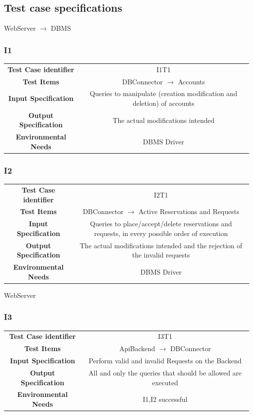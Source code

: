 \documentclass{article}
\begin{document}
\subsection{Test case specifications}
WebServer $\rightarrow$ DBMS
\subsubsection{I1}
\begin{adjustbox}{width=1.2\textwidth}	
	\begin{tabular}{*{2}{c}}
		\toprule
		\textbf{Test Case identifier} & I1T1\\
		\textbf{Test Items} & DBConnector $\rightarrow$ Accounts \\
		\textbf{Input Specification} & Queries to manipulate (creation modification and deletion) of accounts\\
		\textbf{Output Specification} & The actual modifications intended\\
		\textbf{Environmental Needs} & DBMS Driver\\
		\bottomrule
	\end{tabular}
\end{adjustbox}
\subsubsection{I2}
\begin{adjustbox}{width=1.2\textwidth}	
	\begin{tabular}{*{2}{c}}
		\toprule
		\textbf{Test Case identifier} & I2T1\\
		\textbf{Test Items} & DBConnector $\rightarrow$ Active Reservations and Requests \\
		\textbf{Input Specification} & Queries to place/accept/delete reservations and requests, in every possible order of execution\\
		\textbf{Output Specification} & The actual modifications intended and the rejection of the invalid requests\\
		\textbf{Environmental Needs} & DBMS Driver\\
		\bottomrule
	\end{tabular}
\end{adjustbox}

WebServer 
\subsubsection{I3}
\begin{adjustbox}{width=1.2\textwidth}	
	\begin{tabular}{*{2}{c}}
		\toprule
		\textbf{Test Case identifier} & I3T1\\
		\textbf{Test Items} & ApiBackend $\rightarrow$ DBConnector\\
		\textbf{Input Specification} & Perform valid and invalid Requests on the Backend\\
		\textbf{Output Specification} & All and only the queries that should be allowed are executed\\
		\textbf{Environmental Needs} & I1,I2 successful\\
		\bottomrule
	\end{tabular}
\end{adjustbox}
\end{document}
